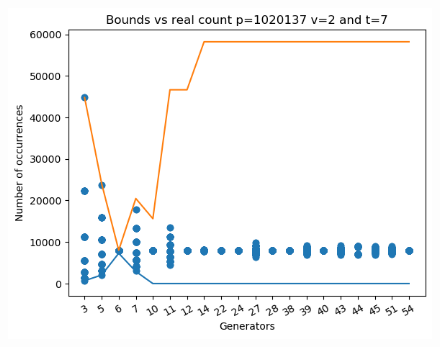 \documentclass{article}
\begin{document}
\begin{figure}[H]
\begin{minipage}{.49\textwidth}
            \includegraphics[width=\textwidth]{../plots/tuples_figures/1020137v2/test_p1020137_v2_t7.png}
    \end{minipage}
\end{figure}
\end{document}

